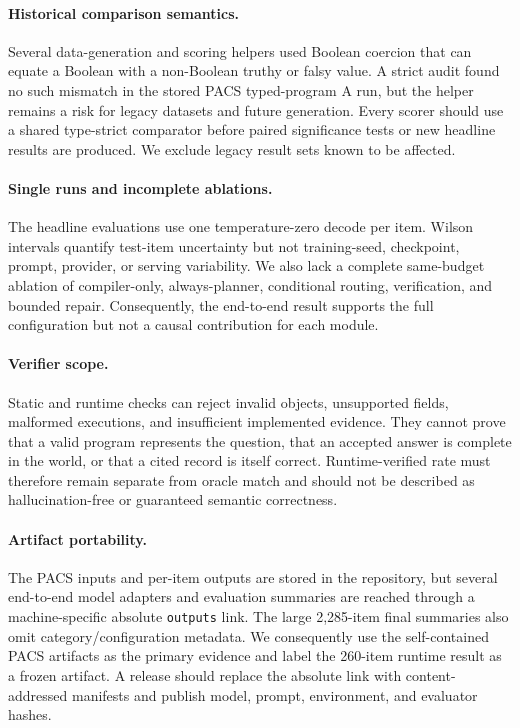 \paragraph{Historical comparison semantics.}
Several data-generation and scoring helpers used Boolean coercion that can equate a Boolean with
a non-Boolean truthy or falsy value.  A strict audit found no such mismatch in the stored PACS
typed-program A run, but the helper remains a risk for legacy datasets and future generation.
Every scorer should use a shared type-strict comparator before paired significance tests or new
headline results are produced.  We exclude legacy result sets known to be affected.

\paragraph{Single runs and incomplete ablations.}
The headline evaluations use one temperature-zero decode per item.  Wilson intervals quantify
test-item uncertainty but not training-seed, checkpoint, prompt, provider, or serving
variability.  We also lack a complete same-budget ablation of compiler-only, always-planner,
conditional routing, verification, and bounded repair.  Consequently, the end-to-end result
supports the full configuration but not a causal contribution for each module.

\paragraph{Verifier scope.}
Static and runtime checks can reject invalid objects, unsupported fields, malformed executions,
and insufficient implemented evidence.  They cannot prove that a valid program represents the
question, that an accepted answer is complete in the world, or that a cited record is itself
correct.  Runtime-verified rate must therefore remain separate from oracle match and should not
be described as hallucination-free or guaranteed semantic correctness.

\paragraph{Artifact portability.}
The PACS inputs and per-item outputs are stored in the repository, but several end-to-end model
adapters and evaluation summaries are reached through a machine-specific absolute
\texttt{outputs} link.  The large 2,285-item final summaries also omit category/configuration
metadata.  We consequently use the self-contained PACS artifacts as the primary evidence and
label the 260-item runtime result as a frozen artifact.  A release should replace the absolute
link with content-addressed manifests and publish model, prompt, environment, and evaluator
hashes.

